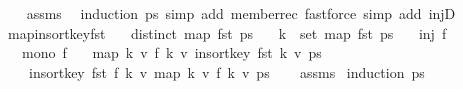 \begin{isabellebody}
%
\isadelimproof
\ \ %
\endisadelimproof
%
\isatagproof
{}\isamarkupfalse%
\ assms\ \isamarkupfalse%
\ {\isacharparenleft}{\kern0pt}induction\ ps{\isacharparenright}{\kern0pt}\ {\isacharparenleft}{\kern0pt}simp\ add{\isacharcolon}{\kern0pt}\ member{\isacharunderscore}{\kern0pt}rec{\isacharparenleft}{\kern0pt}{}{\isacharparenright}{\kern0pt}{\isacharcomma}{\kern0pt}\ fastforce\ simp\ add{\isacharcolon}{\kern0pt}\ injD{\isacharparenright}{\kern0pt}%
\endisatagproof
{\isafoldproof}%
%
\isadelimproof
\isanewline
%
\endisadelimproof
\isanewline
{}\isamarkupfalse%
\ map{\isacharunderscore}{\kern0pt}insort{\isacharunderscore}{\kern0pt}key{\isacharunderscore}{\kern0pt}fst{\isacharcolon}{\kern0pt}\isanewline
\ \ \ {\isachardoublequoteopen}distinct\ {\isacharparenleft}{\kern0pt}map\ fst\ ps{\isacharparenright}{\kern0pt}{\isachardoublequoteclose}\isanewline
\ \ \ {\isachardoublequoteopen}k\ {\isasymnotin}\ set\ {\isacharparenleft}{\kern0pt}map\ fst\ ps{\isacharparenright}{\kern0pt}{\isachardoublequoteclose}\isanewline
\ \ \ {\isachardoublequoteopen}inj\ f{\isachardoublequoteclose}\isanewline
\ \ \ {\isachardoublequoteopen}mono\ f{\isachardoublequoteclose}\isanewline
\ \ \ {\isachardoublequoteopen}map\ {\isacharparenleft}{\kern0pt}{\isasymlambda}{\isacharparenleft}{\kern0pt}k{\isacharcomma}{\kern0pt}\ v{\isacharparenright}{\kern0pt}{\isachardot}{\kern0pt}\ {\isacharparenleft}{\kern0pt}f\ k{\isacharcomma}{\kern0pt}\ v{\isacharparenright}{\kern0pt}{\isacharparenright}{\kern0pt}\ {\isacharparenleft}{\kern0pt}insort{\isacharunderscore}{\kern0pt}key\ fst\ {\isacharparenleft}{\kern0pt}k{\isacharcomma}{\kern0pt}\ v{\isacharparenright}{\kern0pt}\ ps{\isacharparenright}{\kern0pt}\ {\isacharequal}{\kern0pt}\isanewline
\ \ \ \ insort{\isacharunderscore}{\kern0pt}key\ fst\ {\isacharparenleft}{\kern0pt}f\ k{\isacharcomma}{\kern0pt}\ v{\isacharparenright}{\kern0pt}\ {\isacharparenleft}{\kern0pt}map\ {\isacharparenleft}{\kern0pt}{\isasymlambda}{\isacharparenleft}{\kern0pt}k{\isacharcomma}{\kern0pt}\ v{\isacharparenright}{\kern0pt}{\isachardot}{\kern0pt}\ {\isacharparenleft}{\kern0pt}f\ k{\isacharcomma}{\kern0pt}\ v{\isacharparenright}{\kern0pt}{\isacharparenright}{\kern0pt}\ ps{\isacharparenright}{\kern0pt}{\isachardoublequoteclose}\isanewline
%
\isadelimproof
\ \ %
\endisadelimproof
%
\isatagproof
{}\isamarkupfalse%
\ assms\isanewline
{}\isamarkupfalse%
\ {\isacharparenleft}{\kern0pt}induction\ ps{\isacharparenright}{\kern0pt}\isanewline

\end{isabellebody}
